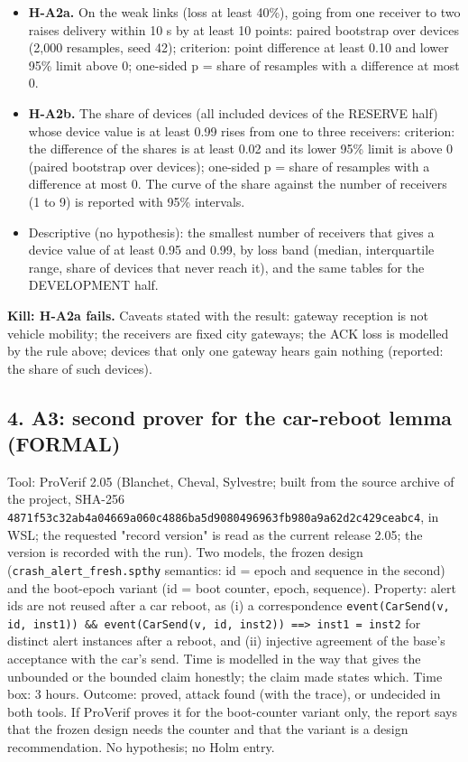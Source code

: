 \begin{itemize}
\item \textbf{H-A2a.} On the weak links (loss at least 40\%), going from one receiver to two raises delivery within 10 s by at least 10 points: paired bootstrap over devices (2,000 resamples, seed 42); criterion: point difference at least 0.10 and lower 95\% limit above 0; one-sided p = share of resamples with a difference at most 0.
\item \textbf{H-A2b.} The share of devices (all included devices of the RESERVE half) whose device value is at least 0.99 rises from one to three receivers: criterion: the difference of the shares is at least 0.02 and its lower 95\% limit is above 0 (paired bootstrap over devices); one-sided p = share of resamples with a difference at most 0. The curve of the share against the number of receivers (1 to 9) is reported with 95\% intervals.
\item Descriptive (no hypothesis): the smallest number of receivers that gives a device value of at least 0.95 and 0.99, by loss band (median, interquartile range, share of devices that never reach it), and the same tables for the DEVELOPMENT half.
\end{itemize}

\textbf{Kill: H-A2a fails.} Caveats stated with the result: gateway reception is not vehicle mobility; the receivers are fixed city gateways; the ACK loss is modelled by the rule above; devices that only one gateway hears gain nothing (reported: the share of such devices).

\subsection*{4. A3: second prover for the car-reboot lemma (FORMAL)}

Tool: ProVerif 2.05 (Blanchet, Cheval, Sylvestre; built from the source archive of the project, SHA-256 \texttt{4871f53c32ab4a04669a060c4886ba5d9080496963fb980a9a62d2c429ceabc4}, in WSL; the requested "record version" is read as the current release 2.05; the version is recorded with the run). Two models, the frozen design (\texttt{crash\_alert\_fresh.spthy} semantics: id = epoch and sequence in the second) and the boot-epoch variant (id = boot counter, epoch, sequence). Property: alert ids are not reused after a car reboot, as (i) a correspondence \texttt{event(CarSend(v, id, inst1)) \&\& event(CarSend(v, id, inst2)) ==> inst1 = inst2} for distinct alert instances after a reboot, and (ii) injective agreement of the base's acceptance with the car's send. Time is modelled in the way that gives the unbounded or the bounded claim honestly; the claim made states which. Time box: 3 hours. Outcome: proved, attack found (with the trace), or undecided in both tools. If ProVerif proves it for the boot-counter variant only, the report says that the frozen design needs the counter and that the variant is a design recommendation. No hypothesis; no Holm entry.

